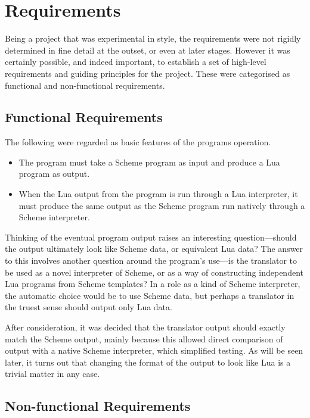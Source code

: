 \section{Requirements}

Being a project that was experimental in style, the requirements were not
rigidly determined in fine detail at the outset, or even at later stages.
However it was certainly possible, and indeed important, to establish a set of
high-level requirements and guiding principles for the project. These were
categorised as functional and non-functional requirements.

\subsection{Functional Requirements}

The following were regarded as basic features of the programs operation.
\begin{itemize}
\item The program must take a Scheme program as input and produce a Lua program
as output.
\item When the Lua output from the program is run through a Lua interpreter, it
must produce the same output as the Scheme program run natively through a Scheme
interpreter.
\end{itemize}
\begin{framed}
Thinking of the eventual program output raises an interesting question---should
the output ultimately look like Scheme data, or equivalent Lua data?  The answer
to this involves another question around the program's use---is the translator
to be used as a novel interpreter of Scheme, or as a way of constructing
independent Lua programs from Scheme templates? In a role as a kind of Scheme
interpreter, the automatic choice would be to use Scheme data, but perhaps a
translator in the truest sense should output only Lua data.

After consideration, it was decided that the translator output should exactly
match the Scheme output, mainly because this allowed direct comparison of output
with a native Scheme interpreter, which simplified testing. As will be seen
later, it turns out that changing the format of the output to look like Lua is a
trivial matter in any case.
\end{framed}

\subsection{Non-functional Requirements}

